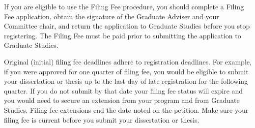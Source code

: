 If you are eligible to use the Filing Fee procedure, you should complete a Filing Fee application, obtain the signature of the Graduate Adviser and your Committee chair, and return the application to Graduate Studies before you stop registering. The Filing Fee must be paid prior to submitting the application to Graduate Studies.

Original (initial) filing fee deadlines adhere to registration deadlines. For example, if you were approved for one quarter of filing fee, you would be eligible to submit your dissertation or thesis up to the last day of late registration for the following quarter. If you do not submit by that date your filing fee status will expire and you would need to secure an extension from your program and from Graduate Studies. Filing fee extensions end the date noted on the petition. Make sure your filing fee is current before you submit your dissertation or thesis.
